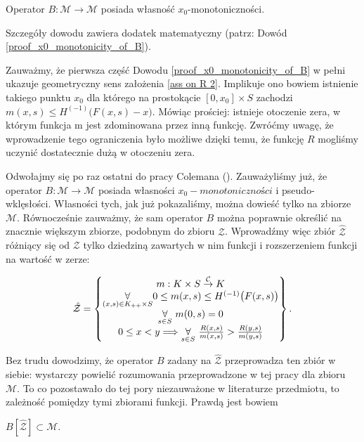 \begin{lemat}\label{x0_monotonicity_of_B}
	Operator $B: \mathcal{M} \rightarrow \mathcal{M}$ posiada własność $x_0$-monotoniczności.
\end{lemat}

Szczegóły dowodu zawiera dodatek matematyczny (patrz: Dowód \ref{proof_x0_monotonicity_of_B}). 

Zauważmy, że pierwsza część Dowodu \ref{proof_x0_monotonicity_of_B} w pełni ukazuje geometryczny sens założenia \ref{ass on R 2}. Implikuje ono bowiem istnienie takiego punktu $x_0$ dla którego na prostokącie $[0,x_0]\times S$ zachodzi $m(x,s) \leq H^{(-1)}\bigl( F(x,s) - x\bigl)$. Mówiąc prościej: istnieje otoczenie zera, w którym funkcja m jest zdominowana przez inną funkcję. Zwróćmy uwagę, że wprowadzenie tego ograniczenia było możliwe dzięki temu, że funkcję $R$ mogliśmy uczynić dostatecznie dużą w otoczeniu zera. 

Odwołajmy się po raz ostatni do pracy Colemana (\citeyear{Coleman2}). Zauważyliśmy już, że operator $B: \mathcal{M} \rightarrow \mathcal{M}$ posiada własności $x_0-monotoniczności$ i pseudo-wklęsłości. Własności tych, jak już pokazaliśmy, można dowieść tylko na zbiorze $\mathcal{M}$. Równocześnie zauważmy, że sam operator $B$ można poprawnie określić na znacznie większym zbiorze, podobnym do zbioru $\mathcal{Z}$. Wprowadźmy więc zbiór $\hat{\mathcal{Z}}$ różniący się od $\mathcal{Z}$ tylko dziedziną zawartych w nim funkcji i rozszerzeniem funkcji na wartość w zerze:

\begin{equation*}
\hat{\mathcal{Z}}= \left \{ \begin{matrix}
m: K \times S \overset{\mathcal{C}}{\rightarrow} K \cr
\underset{(x,s)\in K_{++}\times S}{\forall} 0 \leq m(x,s) \leq H^{(-1)}\big(F(x,s)\bigl) \cr
 \underset{s\in S}{\forall}\,\,m(0,s) = 0 \cr
 0 \leq x < y \Longrightarrow \underset{s\in S}{\forall}\,\, \frac{R(x,s)}{m(x,s)}>\frac{R(y,s)}{m(y,s)}\cr 
\end{matrix} \right \}.
\end{equation*}

Bez trudu dowodzimy, że operator $B$ zadany na $\hat{\mathcal{Z}}$ przeprowadza ten zbiór w siebie: wystarczy powielić rozumowania przeprowadzone w tej pracy dla zbioru $\mathcal{M}$. To co pozostawało do tej pory niezauważone w literaturze przedmiotu, to zależność pomiędzy tymi zbiorami funkcji. Prawdą jest bowiem

\begin{lemat}\label{genialna_uwaga}
	$B[\hat{\mathcal{Z}}] \subset \mathcal{M}$.
\end{lemat}

